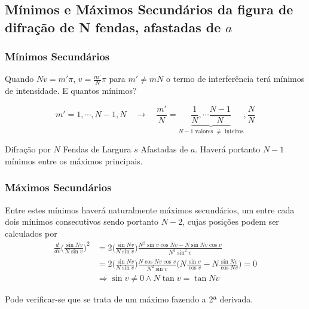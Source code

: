 \documentclass[a4paper,12pt]{article}
\begin{document}
\subsection{Mínimos e Máximos Secundários da figura de difração de N fendas, afastadas de $a$}
\label{sec:maxminNfendas}
\subsubsection{Mínimos Secundários}

Quando $N v = m' \pi$, $v= \frac{m'}{N } \pi$ para $m' \ne m N$ o termo de interferência terá mínimos de intensidade.
E quantos mínimos?
   
\begin{equation*}
	\label{eq:fendasminimos}
	m' =1, \cdots, N-1, N  \quad \rightarrow \quad \frac{m'}{N} = \underbrace{\frac{1}{N}, \cdots  \frac{N-1}{N}}_{N-1 \text{ valores } \ne \text{ inteiros}} , \frac{N}{N}
\end{equation*}

Difração por $N$ Fendas de Largura $s$ Afastadas de $a$.
Haverá  portanto $N-1$ mínimos entre os máximos principais. 
\subsubsection{Máximos Secundários}
Entre estes mínimos haverá naturalmente máximos secundários, um entre cada dois mínimos consecutivos sendo portanto $N-2$, cujas posições podem ser calculados por
\begin{align}
	\frac{d}{d v} \big( \frac{\sin N v }{N \sin v} \big)^2 &= 2 \big( \frac{\sin N v }{N \sin v} \big)
	 \frac{N^2 \sin v \cos N v - N \sin N v \cos v }{N^2 \sin^2 v} \nonumber \\
	&= 2 \big( \frac{\sin N v }{N \sin v} \big)  \frac{N \cos N v \cos v}{N^2 \sin v}
	\big( N\frac{\sin v}{\cos v}  - N\frac{\sin N v}{\cos N v} \big) = 0 \nonumber \\
	&\Rightarrow \sin v \ne 0 \land N \tan v =  \tan Nv \label{eq:47}
\end{align}

Pode verificar-se que se trata de um máximo fazendo a 2ª derivada.
\end{document}
